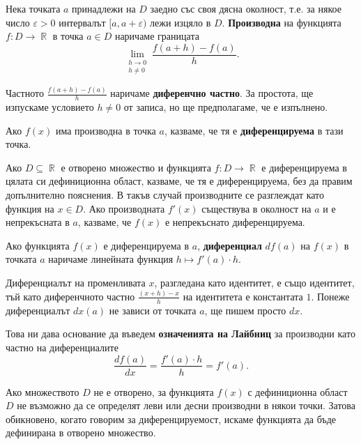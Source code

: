 \documentclass{../../common/topic}
\begin{document}
\begin{definition}
  Нека точката \( a \) принадлежи на \( D \) заедно със своя дясна околност, т.е. за някое число \( \varepsilon > 0 \) интервалът \( [a, a + \varepsilon) \) лежи изцяло в \( D \). \textbf{Производна} на функцията \( f: D \to \BbbR \) в точка \( a \in D \) наричаме границата
  \begin{equation*}
    \lim_{\substack{h \to 0 \\ h \neq 0}} \frac {f(a + h) - f(a)} h.
  \end{equation*}

  Частното \( \frac {f(a + h) - f(a)} h \) наричаме \textbf{диференчно частно}. За простота, ще изпускаме условието \( h \neq 0 \) от записа, но ще предполагаме, че е изпълнено.

  Ако \( f(x) \) има производна в точка \( a \), казваме, че тя е \textbf{диференцируема} в тази точка.

  Ако \( D \subseteq \BbbR \) е отворено множество и функцията \( f: D \to \BbbR \) е диференцируема в цялата си дефиниционна област, казваме, че тя е диференцируема, без да правим допълнително пояснения. В такъв случай производните се разглеждат като функция на \( x \in D \). Ако производната \( f'(x) \) съществува в околност на \( a \) и е непрекъсната в \( a \), казваме, че \( f(x) \) е непрекъснато диференцируема.

  Ако функцията \( f(x) \) е диференцируема в \( a \), \textbf{диференциал} \( df(a) \) на \( f(x) \) в точката \( a \) наричаме линейната функция \( h \mapsto f'(a) \cdot h \).

  Диференциалът на променливата \( x \), разгледана като идентитет, е също идентитет, тъй като диференчното частно \( \frac {(x + h) - x} h \) на идентитета е константата \( 1 \). Понеже диференциалът \( dx(a) \) не зависи от точката \( a \), ще пишем просто \( dx \).

  Това ни дава основание да въведем \textbf{означенията на Лайбниц} за производни като частно на диференциалите
  \begin{equation*}
    \frac {df(a)} {dx} = \frac {f'(a) \cdot h} h = f'(a).
  \end{equation*}
\end{definition}

\begin{remark}
  Ако множеството \( D \) не е отворено, за функцията \( f(x) \) с дефиниционна област \( D \) не възможно да се определят леви или десни производни в някои точки. Затова обикновено, когато говорим за диференцируемост, искаме функцията да бъде дефинирана в отворено множество.
\end{remark}
\end{document}
